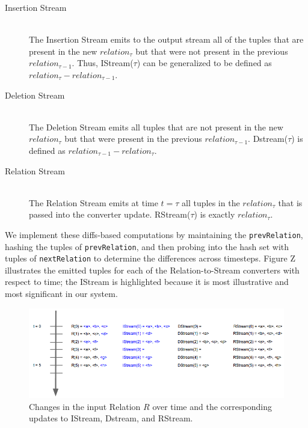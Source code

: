 \documentclass[a4paper, 10pt, conference]{IEEEconf}
\begin{document}
\begin{description}
    \item[Insertion Stream] \hfill \\
    The Insertion Stream emits to the output stream all of the tuples that are present in the new $relation_{\tau}$ but that were not present in the previous $relation_{\tau - 1}$. Thus, IStream($\tau$) can be generalized to be defined as $relation_{\tau} -relation_{\tau - 1}$.

    \item[Deletion Stream] \hfill \\
    The Deletion Stream emits all tuples that are not present in the new $relation_{\tau}$ but that were present in the previous $relation_{\tau - 1}$. Dstream($\tau$) is defined as $relation_{\tau - 1} - relation_{\tau}$.

    \item[Relation Stream] \hfill \\
    The Relation Stream emits at time $t = \tau$ all tuples in the $relation_{\tau}$ that is passed into the converter update. RStream($\tau$) is exactly $relation_{\tau}$.

\end{description}


We implement these diffs-based computations by maintaining the \texttt{prevRelation}, hashing the tuples of \texttt{prevRelation}, and then probing into the hash set with tuples of \texttt{nextRelation} to determine the differences across timesteps. Figure Z illustrates the emitted tuples for each of the Relation-to-Stream converters with respect to time; the IStream is highlighted because it is most illustrative and most significant in our system. 

\begin{figure}[h!]
    \centering
    \centerline{\includegraphics[totalheight=3cm]{stream_converter.png}}
    \caption{Changes in the input Relation $R$ over time and the corresponding updates to IStream, Dstream, and RStream.}
    \label{fig:stream_converter}
\end{figure}
\end{document}
